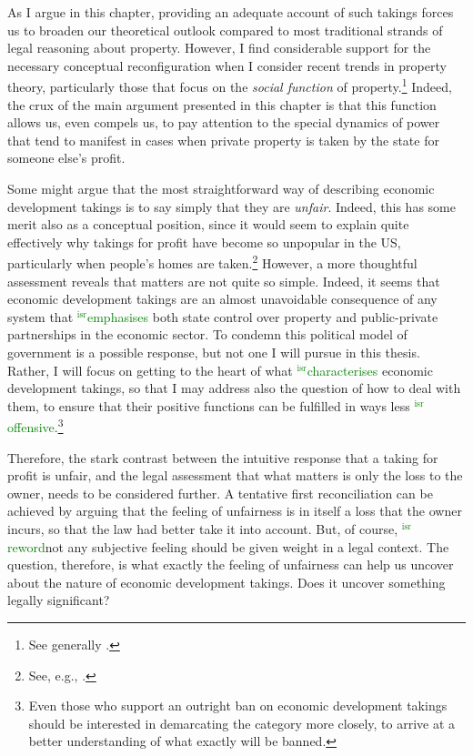 \documentclass[12pt,a4paper]{book} %
\newcommand{\isr}[1]{\textcolor{green}{$^{\textrm{isr}}${#1}}}
\begin{document}
As I argue in this chapter, providing an adequate account of such takings forces us to broaden our theoretical outlook compared to most traditional strands of legal reasoning about property. However, I find considerable support for the necessary conceptual reconfiguration when I consider recent trends in property theory, particularly those that focus on the {\it social function} of property.\footnote{See generally \cite{alexander09a,foster11,singer00,underkuffler03,alexander06,alexander10,dagan11}.} Indeed, the crux of the main argument presented in this chapter is that this function allows us, even compels us, to pay attention to the special dynamics of power that tend to manifest in cases when private property is taken by the state for someone else's profit.

Some might argue that the most straightforward way of describing economic development takings is to say simply that they are {\it unfair}. Indeed, this has some merit also as a conceptual position, since it would seem to explain quite effectively why takings for profit have become so unpopular in the US, particularly when people's homes are taken.\footnote{See, e.g., \cite[742-748]{nadler08}.}  However, a more thoughtful assessment reveals that matters are not quite so simple. Indeed, it seems that economic development takings are an almost unavoidable consequence of any system that \isr {emphasises} both state control over property and public-private partnerships in the economic sector. To condemn this political model of government is a possible response, but not one I will pursue in this thesis. Rather, I will focus on getting to the heart of what \isr {characterises} economic development takings, so that I may address also the question of how to deal with them, to ensure that their positive functions can be fulfilled in ways less \isr {offensive}.\footnote{Even those who support an outright ban on economic development takings should be interested in demarcating the category more closely, to arrive at a better understanding of what exactly will be banned.}

Therefore, the stark contrast between the intuitive response that a taking for profit is unfair, and the legal assessment that what matters is only the loss to the owner, needs to be considered further. A tentative first reconciliation can be achieved by arguing that the feeling of unfairness is in itself a loss that the owner incurs, so that the law had better take it into account. But, of course, \isr {reword}not any subjective feeling should be given weight in a legal context. The question, therefore, is what exactly the feeling of unfairness can help us uncover about the nature of economic development takings. Does it uncover something legally significant?
\end{document}
